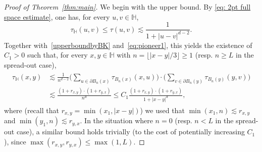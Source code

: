 \documentclass[11pt,a4paper]{article}
\numberwithin{equation}{section}
\theoremstyle{plain}
\theoremstyle{definition}
\begin{document}
\begin{proof}[Proof of Theorem~\textup{\ref{thm:main}}] We begin with the upper bound. By \eqref{eq: 2pt full space estimate}, one has, for every $u,v\in \mathbb H$,
\begin{equation}\label{2pointfull}
\tau_{\mathbb H}(u,v) \le \tau(u,v) \lesssim \frac 1{1+|u-v|^{d-2}}.
\end{equation}
Together with~\eqref{upperboundbyBK} and~\eqref{eq:pioneer1}, this yields the existence of $C_1>0$ such that, for every $x,y\in \mathbb H$ with $n=\lfloor|x-y|/3\rfloor\geq 1$ (resp. $n\geq L$ in the spread-out case), 
\begin{align}
\begin{split}
\tau_{\mathbb H}(x,y)&\lesssim \frac 1{n^{d-2}} \Big(\sum_{u\in \partial B_n(x)} \tau_{B_n(x)}(x,u)\Big) \cdot \Big(\sum_{v\in \partial B_n(y)} \tau_{B_n(y)}(y,v)\Big) \\&\lesssim \frac{(1+r_{x,y}) \cdot (1+r_{y,x})}{n^d}\leq C_1 \frac{(1+r_{x,y}) \cdot (1+r_{y,x})}{1+|x-y|^d},
\end{split}
\end{align}
where (recall that $r_{x,y}=\min(x_1,|x-y|)$) we used that $\min(x_1,n)\lesssim r_{x,y}$ and $\min(y_1,n)\lesssim r_{y,x}$.
In the situation where $n=0$ (resp. $n<L$ in the spread-out case), a similar bound holds trivially (to the cost of potentially increasing $C_1$), 
since  $\max(r_{x,y},r_{y,x})\leq \max(1,L)$. 



\end{proof}
\end{document}
